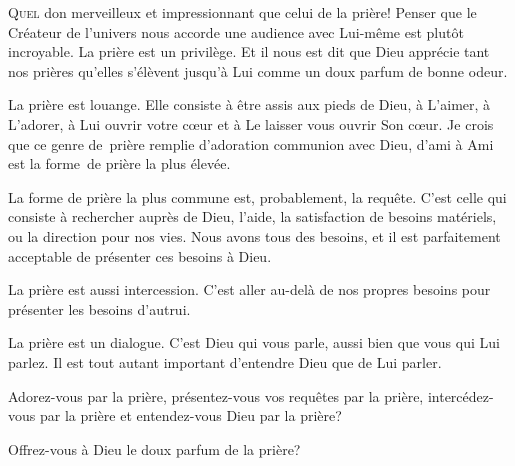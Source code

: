 


\lettrine{Q}{uel} don merveilleux et impressionnant que celui de la prière!
 Penser que le Créateur de l'univers nous accorde une audience avec Lui-même
 est plutôt incroyable. La prière est un privilège.
 Et il nous est dit que Dieu apprécie tant nos prières qu'elles s'élèvent
 jusqu'à Lui comme un doux parfum de bonne odeur.

La prière est louange. 
 Elle consiste à être assis aux pieds de Dieu, à L'aimer, à L'adorer,
 à Lui ouvrir votre c\oe{}ur et à Le laisser vous ouvrir Son c\oe{}ur.
 Je crois que ce genre de~prière remplie d'adoration
 \ocadr communion avec Dieu, d'ami à Ami \fcadr{}
 est la forme~de prière la plus élevée.


La forme de prière la plus commune est, probablement, la requête.
 C'est celle qui consiste à rechercher auprès de Dieu, 
 l'aide, la satisfaction de besoins matériels, ou la direction pour nos vies.
 Nous avons tous des besoins, et il est parfaitement acceptable
 de présenter ces besoins à Dieu.

La prière est aussi intercession. 
 C'est aller au-delà de nos propres besoins pour présenter les besoins d'autrui.

La prière est un dialogue. C'est Dieu qui vous parle,
 aussi bien que vous qui Lui parlez.
 Il est tout autant 
 important d'entendre Dieu que de Lui parler.

Adorez-vous par la prière, présentez-vous vos requêtes par la prière,
 intercédez-vous par la prière et entendez-vous Dieu par la prière?

Offrez-vous à Dieu le doux parfum de la prière?

\dvrule



